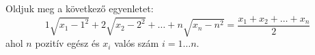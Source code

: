    Oldjuk meg a következő egyenletet: 
   $$
   1\sqrt{x_{1}-1^{2}}+2\sqrt{x_{2}-2^{2}}+\hdots+n\sqrt{x_{n}-n^{2}}=
   \frac{x_{1}+x_{2}+\hdots+x_{n}}{2}
   $$
   ahol $n$ pozitív egész és $x_{i}$ valós szám $i=1\hdots n$.
